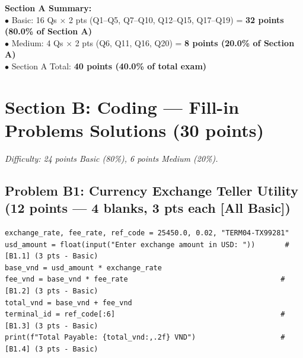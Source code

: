 \documentclass[11pt,a4paper]{article}
\begin{document}
\vspace{1mm}
\begin{tcolorbox}[colback=boxbg, colframe=primaryblue!45, arc=1.2mm, left=2.0mm, right=2.0mm, top=1.0mm, bottom=1.0mm]
\small
\textbf{Section A Summary:}\\
$\bullet$ Basic: 16 Qs $\times$ 2 pts (Q1--Q5, Q7--Q10, Q12--Q15, Q17--Q19) = \textbf{32 points (80.0\% of Section A)}\\
$\bullet$ Medium: 4 Qs $\times$ 2 pts (Q6, Q11, Q16, Q20) = \textbf{8 points (20.0\% of Section A)}\\
$\bullet$ Section A Total: \textbf{40 points (40.0\% of total exam)}
\end{tcolorbox}

\section*{Section B: Coding --- Fill-in Problems Solutions (30 points)}
\textit{Difficulty: 24 points Basic (80\%), 6 points Medium (20\%).}

\subsection*{Problem B1: Currency Exchange Teller Utility (12 points --- 4 blanks, 3 pts each [All Basic])}

\begin{lstlisting}
exchange_rate, fee_rate, ref_code = 25450.0, 0.02, "TERM04-TX99281"
usd_amount = float(input("Enter exchange amount in USD: "))       # [B1.1] (3 pts - Basic)
base_vnd = usd_amount * exchange_rate
fee_vnd = base_vnd * fee_rate                                    # [B1.2] (3 pts - Basic)
total_vnd = base_vnd + fee_vnd
terminal_id = ref_code[:6]                                       # [B1.3] (3 pts - Basic)
print(f"Total Payable: {total_vnd:,.2f} VND")                    # [B1.4] (3 pts - Basic)
\end{lstlisting}
\end{document}
